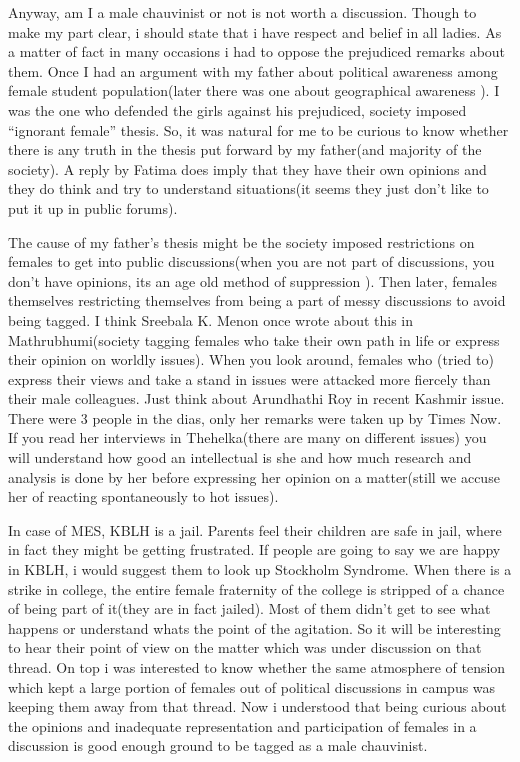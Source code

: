 Anyway, am I a male chauvinist or not is not worth a discussion. Though to make my part clear, 
i should state that i have respect and belief in all ladies. As a matter of fact in many occasions i had to 
oppose the prejudiced remarks about them. Once I had an argument with my father about political awareness 
among female student population(later there was one about geographical awareness  ). 
I was the one who defended the girls against his prejudiced, society imposed ``ignorant female'' thesis. 
So, it was natural for me to be curious to know whether there is any truth in the thesis put forward by my 
father(and majority of the society). A reply by Fatima does imply that they have their own opinions and they 
do think and try to understand situations(it seems they just don't like to put it up in public forums).

The cause of my father's thesis might be the society imposed restrictions on females to get into public 
discussions(when you are not part of discussions, you don't have opinions, its an age old method of suppression  ). 
Then later, females themselves restricting themselves from being a part of messy discussions to avoid being tagged. 
I think Sreebala K. Menon once wrote about this in Mathrubhumi(society tagging females who take their own path in life 
or express their opinion on worldly issues). When you look around, females who (tried to) express their views and take a 
stand in issues were attacked more fiercely than their male colleagues. Just think about Arundhathi Roy in 
recent Kashmir issue. There were 3 people in the dias, only her remarks were taken up by Times Now. 
If you read her interviews in Thehelka(there are many on different issues) you will understand how good an 
intellectual is she and how much research and analysis is done by her before expressing her opinion on a 
matter(still we accuse her of reacting spontaneously to hot issues).

In case of MES, KBLH is a jail. Parents feel their children are safe in jail, where in fact they might be 
getting frustrated. If people are going to say we are happy in KBLH, i would suggest them to look up 
Stockholm Syndrome. When there is a strike in college, the entire female fraternity of the college is stripped of a 
chance of being part of it(they are in fact jailed). Most of them didn't get to see what happens or understand 
whats the point of the agitation. So it will be interesting to hear their point of view on the matter which was 
under discussion on that thread. On top i was interested to know whether the same atmosphere of tension which kept a 
large portion of females out of political discussions in campus was keeping them away from that thread. 
Now i understood that being curious about the opinions and inadequate representation and participation of 
females in a discussion is good enough ground to be tagged as a male chauvinist.

